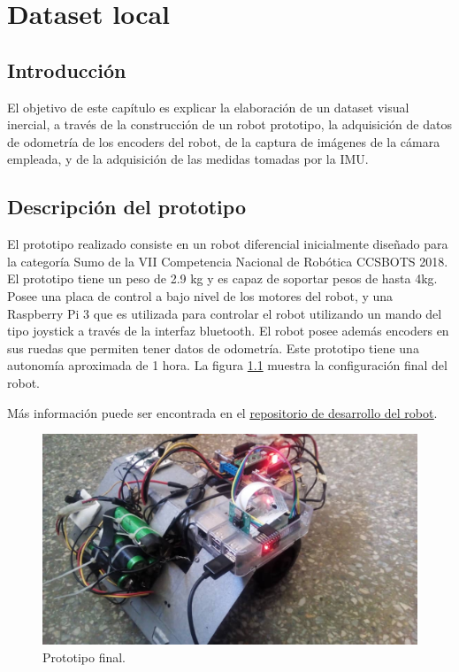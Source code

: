 \chapter{Dataset local}
\label{capitulo5}


\section{Introducción}
El objetivo de este capítulo es explicar la elaboración de un dataset visual inercial, a través de la construcción de un robot prototipo, la adquisición de datos de odometría de los encoders del robot, de la captura de imágenes de la cámara empleada, y de la adquisición de las medidas tomadas por la IMU.


\clearpage

\section{Descripción del prototipo}

El prototipo realizado consiste en un robot diferencial inicialmente diseñado para la categoría Sumo de la VII Competencia Nacional de Robótica CCSBOTS 2018. El prototipo tiene un peso de 2.9 kg y es capaz de soportar pesos de hasta 4kg. Posee una placa de control a bajo nivel de los motores del robot, y una Raspberry Pi 3 que es utilizada para controlar el robot utilizando un mando del tipo joystick a través de la interfaz bluetooth. El robot posee además encoders en sus ruedas que permiten tener datos de odometría. Este prototipo tiene una autonomía aproximada de 1 hora. La figura \ref{imagen:Robot} muestra la configuración final del robot. 

Más información puede ser encontrada en el \href{https://github.com/Robot-Sumo/}{\underline{repositorio de desarrollo del robot}}.


\begin{figure}[H]
	\centering		\includegraphics[width=0.7\linewidth]{imagenes/prototipo/Robot}
	\caption{Prototipo final.}
	\label{imagen:Robot}
\end{figure}


